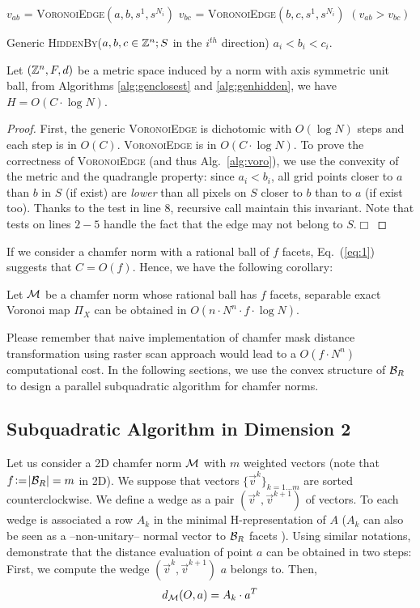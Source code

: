 \documentclass{llncs}
\begin{document}
\begin{algorithm}[H]\footnotesize
  $v_{ab}$ = \textsc{VoronoiEdge}$(a,b,s^1, s^{N_i})$\;
  $v_{bc}$ = \textsc{VoronoiEdge}$(b,c,s^1, s^{N_i})$\;
  \Return $(v_{ab}> v_{bc})$\;
  \caption{\footnotesize Generic \textsc{HiddenBy}($a,b,c\in{\mathbb{Z}}^n; S$ in the $i^{th}$
    direction) $a_i<b_i<c_i$.\label{alg:genhidden}}
\end{algorithm}
\begin{lemma}
\label{lem:genericDich}
   Let $({\mathbb{Z}}^n, F, d)$ be a metric space induced by a norm with axis
   symmetric unit ball,   from Algorithms \ref{alg:genclosest} and
   \ref{alg:genhidden}, we have $H=O(C\cdot \log{N})$.
\end{lemma}
\begin{proof}
  First, the generic \textsc{VoronoiEdge} is dichotomic with
  $O(\log{N})$ steps and each step is in  $O(C)$. \textsc{VoronoiEdge} is
  in $O(C\cdot\log{N})$.  To prove the correctness of
  \textsc{VoronoiEdge} (and thus Alg.~\ref{alg:voro}), we use the
  convexity of the metric and the quadrangle property: since
  $a_i<b_i$, all grid points closer to $a$ than $b$ in $S$ (if exist)
  are \emph{lower} than all pixels on $S$ closer to $b$ than to $a$
  (if exist too). Thanks to the test in line $8$, recursive call maintain
  this invariant. Note that tests on lines $2-5$ handle the fact that the edge
  may not belong to $S$.$\Box$
\end{proof}
If we consider a chamfer norm with a rational ball of $f$ facets, Eq.~(\ref{eq:1})
suggests that $C=O(f)$. Hence, we have the following corollary:
\begin{corollary}
  Let $\mathcal{M}$ be a chamfer norm whose rational ball has $f$ facets,
  separable exact Voronoi map $\Pi_X$ can be obtained in
    $O(n\cdot N^n\cdot f \cdot \log{N})$.
\end{corollary}
Please remember that naive implementation of chamfer mask distance
transformation using raster scan approach would lead to a $O(f\cdot
N^n)$ computational cost. In the following sections, we use the convex
structure of $\mathcal{B}_R$ to design a parallel subquadratic algorithm for chamfer
norms.

\subsection{Subquadratic Algorithm in Dimension 2}
\label{sec:subq-algor-dimens}

Let us consider a 2D chamfer norm $\mathcal{M}$ with $m$ weighted vectors (note
that $f\!\mathrel{\mathop:}=\!|\mathcal{B}_R| = m$ in 2D). We suppose that vectors
$\{\vec{v}^k\}_{k=1\ldots m}$ are sorted counterclockwise. We define a wedge
as a pair $(\vec{v}^k,\vec{v}^{k+1})$ of vectors. To each wedge is
associated a row $A_k$ in the minimal H-representation of $A$ ($A_k$
can also be seen as a  --non-unitary-- normal vector to $\mathcal{B}_R$ facets
\cite{DBLP:journals/pr/NormandE09}). Using similar notations,
\cite{Thiel_hdr,Strand2008} demonstrate that the distance evaluation
of point $a$ can be obtained in two steps: First, we compute the wedge
$(\vec{v}^k,\vec{v}^{k+1})$ $a$ belongs to. Then,
\begin{equation}
\label{eq:2}
  d_{\mathcal{M}}(O,a) = A_k\cdot a^T
\end{equation}
\end{document}
